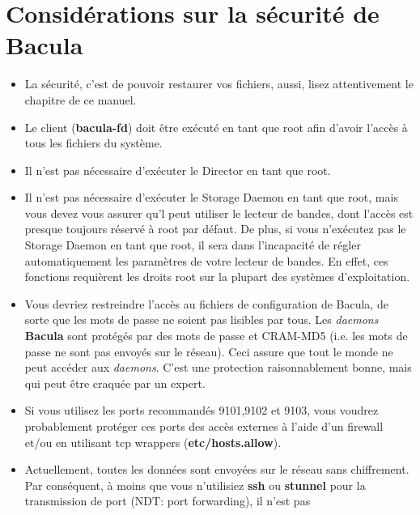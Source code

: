 
\chapter{Consid\'erations sur la s\'ecurit\'e de Bacula}
\label{_ChapterStart14}

\begin{itemize}
\item La s\'ecurit\'e, c'est de pouvoir restaurer vos fichiers, aussi, lisez 
   attentivement le chapitre  de 
   ce manuel.
\item Le client ({\bf bacula-fd}) doit \^etre ex\'ecut\'e en tant que root
   afin d'avoir  l'acc\`es \`a tous les fichiers du syst\`eme. 
\item Il n'est pas n\'ecessaire d'ex\'ecuter le Director en tant que root. 
\item Il n'est pas n\'ecessaire d'ex\'ecuter le Storage Daemon en tant que
   root, mais  vous devez vous assurer qu'l peut utiliser le lecteur de bandes,
   dont l'acc\`es  est presque toujours r\'eserv\'e \`a root par d\'efaut.
   De plus, si vous n'ex\'ecutez pas le Storage Daemon en tant que root, il sera 
   dans l'incapacit\'e de r\'egler automatiquement les param\`etres de votre lecteur 
   de bandes. En effet, ces fonctions requi\`erent les droits root sur la plupart 
   des syst\`emes d'exploitation.
\item Vous devriez restreindre l'acc\`es au fichiers de configuration de
   Bacula, de  sorte que les mots de passe ne soient pas lisibles par tous.  Les
   {\it daemons} {\bf Bacula} sont prot\'eg\'es par des mots de passe et CRAM-MD5
(i.e. les mots de passe ne sont pas envoy\'es sur le r\'eseau). Ceci assure
que tout le  monde ne peut acc\'eder aux {\it daemons}. C'est une protection
raisonnablement bonne,  mais qui peut \^etre craqu\'ee par un expert. 
\item Si vous utilisez les ports recommand\'es 9101,9102 et 9103, vous voudrez
   probablement  prot\'eger ces ports des acc\`es externes \`a l'aide d'un
   firewall et/ou en utilisant  tcp wrappers ({\bf etc/hosts.allow}).  
\item Actuellement, toutes les donn\'ees sont envoy\'ees sur le r\'eseau sans
   chiffrement. Par  cons\'equent, \`a moins que vous n'utilisiez {\bf ssh} ou {\bf
   stunnel} pour la  transmission de port (NDT: port forwarding), il n'est pas

\end{itemize}
